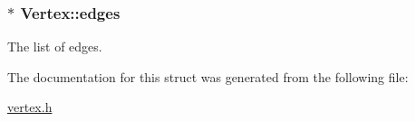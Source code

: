 \subsubsection[{\texorpdfstring{edges}{edges}}]{$\ast$ Vertex\+::edges}\hypertarget{structVertex_a1d47f7cbd5679ba2c22c556b39f994a8}{}\label{structVertex_a1d47f7cbd5679ba2c22c556b39f994a8}
The list of edges. 

The documentation for this struct was generated from the following file\+:\begin{DoxyCompactItemize}
\item 
\hyperlink{vertex_8h}{vertex.\+h}\end{DoxyCompactItemize}
